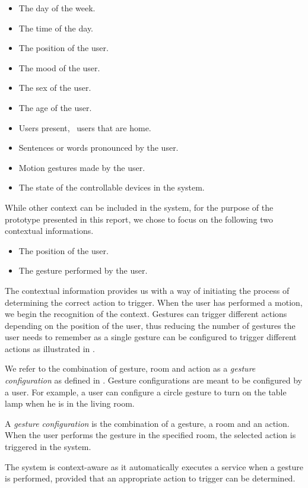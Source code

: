 \begin{itemize}
\item The day of the week.
\item The time of the day.
\item The position of the user.
\item The mood of the user.
\item The sex of the user.
\item The age of the user.
\item Users present, \eg~users that are home.
\item Sentences or words pronounced by the user.
\item Motion gestures made by the user.
\item The state of the controllable devices in the system.
\end{itemize}

While other context can be included in the system, for the purpose of the prototype presented in this report, we chose to focus on the following two contextual informations.

\begin{itemize}
\item The position of the user.
\item The gesture performed by the user.
\end{itemize}

The contextual information provides us with a way of initiating the process of determining the correct action to trigger. When the user has performed a motion, we begin the recognition of the context. Gestures can trigger different actions depending on the position of the user, thus reducing the number of gestures the user needs to remember as a single gesture can be configured to trigger different actions as illustrated in .

We refer to the combination of gesture, room and action as a \emph{gesture configuration} as defined in . Gesture configurations are meant to be configured by a user. For example, a user can configure a circle gesture to turn on the table lamp when he is in the living room.

\begin{definition}
\label{def:gesture-configuration}
A \emph{gesture configuration} is the combination of a gesture, a room and an action. When the user performs the gesture in the specified room, the selected action is triggered in the system.
\end{definition}

The system is context-aware as it automatically executes a service when a gesture is performed, provided that an appropriate action to trigger can be determined.

